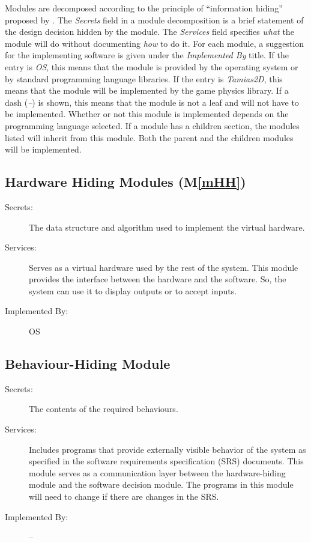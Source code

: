 \documentclass[12pt]{article}
\newcommand{\mref}[1]{M\ref{#1}}
\begin{document}
Modules are decomposed according to the principle of ``information hiding''
proposed by \citet{ParnasEtAl1984}. The \emph{Secrets} field in a module
decomposition is a brief statement of the design decision hidden by the
module. The \emph{Services} field specifies \emph{what} the module will do
without documenting \emph{how} to do it. For each module, a suggestion for the implementing software is given under the \emph{Implemented By} title. If the entry is \emph{OS}, this means that the module is provided by the operating system or by standard programming language libraries. If the entry is \emph{Tamias2D}, this means that the module will be implemented by the game physics library.  
If a dash (\emph{--}) is shown, this means
that the module is not a leaf and will not have to be implemented. Whether or
not this module is implemented depends on the programming language
selected.
If a module has a children section, the modules listed will inherit from  
this module. Both the parent and the children modules will be implemented.

\subsection{Hardware Hiding Modules (\mref{mHH})}

\begin{description}
\item[Secrets:]The data structure and algorithm used to implement the virtual
  hardware.
\item[Services:] Serves as a virtual hardware used by the rest of the
  system. This module provides the interface between the hardware and the
  software. So, the system can use it to display outputs or to accept inputs.
\item[Implemented By:] OS
\end{description}

\subsection{Behaviour-Hiding Module}

\begin{description}
\item[Secrets:]The contents of the required behaviours.
\item[Services:]Includes programs that provide externally visible behavior of
  the system as specified in the software requirements specification (SRS)
  documents. This module serves as a communication layer between the
  hardware-hiding module and the software decision module. The programs in this module will need to change if there are changes in the SRS.
\item[Implemented By:] --
\end{description}
\end{document}
